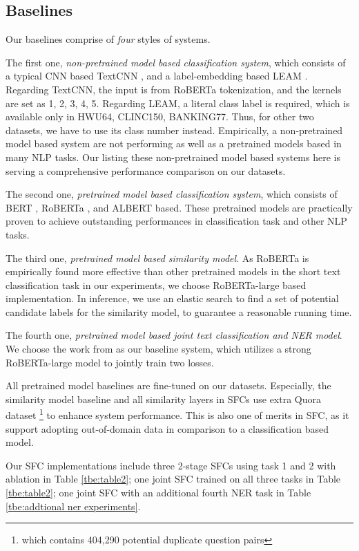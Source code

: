 \subsection{Baselines}
Our baselines comprise of \emph{four} styles of systems. 

The first one, \emph{non-pretrained model based classification system}, which consists of a typical CNN based TextCNN \cite{kim2014convolutional}, and a label-embedding based LEAM \cite{wang2018joint}. 
Regarding TextCNN, the input is from RoBERTa tokenization, and the kernels are set as 1, 2, 3, 4, 5. 
Regarding LEAM, a literal class label is required, which is available only in HWU64, CLINC150, BANKING77. 
Thus, for other two datasets, we have to use its class number instead. 
Empirically, a non-pretrained model based system are not performing as well as a pretrained models based in many NLP tasks.
Our listing these non-pretrained model based systems here is serving a comprehensive performance comparison on our datasets.

The second one, \emph{pretrained model based classification system}, which consists of BERT \cite{devlin2018bert}, RoBERTa \cite{liu2019roberta}, and ALBERT \cite{lan2019albert} based. 
These pretrained models are practically proven to achieve outstanding performances in classification task and other NLP tasks.

The third one, \emph{pretrained model based similarity model}. 
As RoBERTa is empirically found more effective than other pretrained models in the short text classification task in our experiments, we choose RoBERTa-large based implementation.
In inference, we use an elastic search to find a set of potential candidate labels for the similarity model, to guarantee a reasonable running time.

The fourth one, \emph{pretrained model based joint text classification and NER model}. 
We choose the work from \cite{chen2019bert} as our baseline system, which utilizes a strong RoBERTa-large model to jointly train two losses.

All pretrained model baselines are fine-tuned on our datasets.
Especially, the similarity model baseline and all similarity layers in SFCs use extra Quora dataset \cite{iyer2017first} \footnote{which contains 404,290 potential duplicate question pairs} to enhance system performance. 
This is also one of merits in SFC, as it support adopting out-of-domain data in comparison to a classification based model.

Our SFC implementations include three 2-stage SFCs using task 1 and 2 with ablation in Table \ref{tbe:table2}; one joint SFC trained on all three tasks in Table \ref{tbe:table2}; one joint SFC with an additional fourth NER task in Table \ref{tbe:addtional ner experiments}. 

